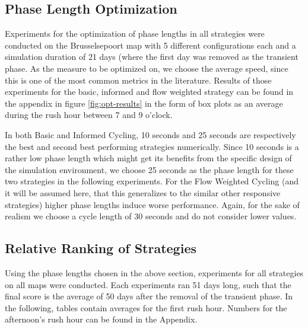 \documentclass[11pt]{article}
\begin{document}
\subsection{Phase Length Optimization}
Experiments for the optimization of phase lengths in all strategies were conducted on the Brusselsepoort map with 5 different configurations each and a simulation duration of 21 days (where the first day was removed as the transient phase. As the measure to be optimized on, we choose the average speed, since this is one of the most common metrics in the literature. Results of those experiments for the basic, informed and flow weighted strategy can be found in the appendix in figure \ref{fig:opt-results} in the form of box plots as an average during the rush hour between 7 and 9 o'clock.

In both Basic and Informed Cycling, 10 seconds and 25 seconds are respectively the best and second best performing strategies numerically. Since 10 seconds is a rather low phase length which might get its benefits from the specific design of the simulation environment, we choose 25 seconds as the phase length for these two strategies in the following experiments. For the Flow Weighted Cycling (and it will be assumed here, that this generalizes to the similar other responsive strategies) higher phase lengths induce worse performance. Again, for the sake of realism we choose a cycle length of 30 seconds and do not consider lower values.

\subsection{Relative Ranking of Strategies}
Using the phase lengths chosen in the above section, experiments for all strategies on all maps were conducted. Each experiments ran 51 days long, such that the final score is the average of 50 days after the removal of the transient phase. In the following, tables contain averages for the first rush hour. Numbers for the afternoon's rush hour can be found in the Appendix.
\end{document}
